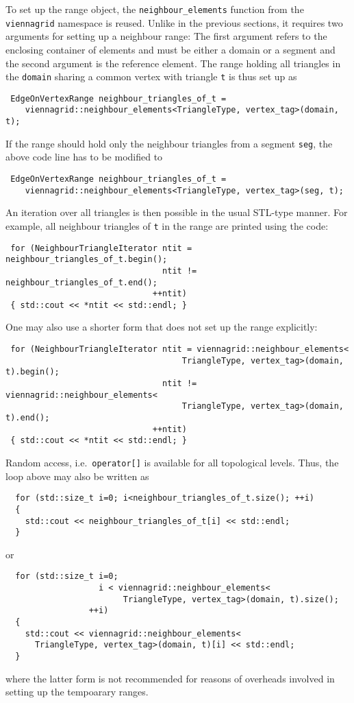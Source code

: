 To set up the range object, the \lstinline|neighbour_elements| function from the \lstinline|viennagrid| namespace is reused. Unlike in the previous sections, it requires two arguments
for setting up a neighbour range: The first argument refers to the enclosing container of elements and must be either a domain or a segment and the second argument is the reference element.
The range holding all triangles in the \lstinline|domain| sharing a common vertex with triangle \lstinline|t| is thus set up as
\begin{lstlisting}
 EdgeOnVertexRange neighbour_triangles_of_t =
    viennagrid::neighbour_elements<TriangleType, vertex_tag>(domain, t);
\end{lstlisting}
If the range should hold only the neighbour triangles from a segment \lstinline|seg|, the above code line has to be modified to
\begin{lstlisting}
 EdgeOnVertexRange neighbour_triangles_of_t =
    viennagrid::neighbour_elements<TriangleType, vertex_tag>(seg, t);
\end{lstlisting}
An iteration over all triangles is then possible in the usual STL-type manner. For example, all neighbour triangles of \lstinline|t| in the range are printed using the code:
\begin{lstlisting}
 for (NeighbourTriangleIterator ntit = neighbour_triangles_of_t.begin();
                                ntit != neighbour_triangles_of_t.end();
                              ++ntit)
 { std::cout << *ntit << std::endl; }
\end{lstlisting}

\pagebreak

One may also use a shorter form that does not set up the range explicitly:
\begin{lstlisting}
 for (NeighbourTriangleIterator ntit = viennagrid::neighbour_elements<
                                    TriangleType, vertex_tag>(domain, t).begin();
                                ntit != viennagrid::neighbour_elements<
                                    TriangleType, vertex_tag>(domain, t).end();
                              ++ntit)
 { std::cout << *ntit << std::endl; }
\end{lstlisting}

Random access, i.e.~\lstinline|operator[]| is available for all topological levels. Thus, the loop above may also be written as
\begin{lstlisting}
  for (std::size_t i=0; i<neighbour_triangles_of_t.size(); ++i)
  {
    std::cout << neighbour_triangles_of_t[i] << std::endl;
  }
\end{lstlisting}
or 
\begin{lstlisting}
  for (std::size_t i=0;
                   i < viennagrid::neighbour_elements<
                        TriangleType, vertex_tag>(domain, t).size();
                 ++i)
  {
    std::cout << viennagrid::neighbour_elements<
      TriangleType, vertex_tag>(domain, t)[i] << std::endl;
  }
\end{lstlisting}
where the latter form is not recommended for reasons of overheads involved in setting up the tempoarary ranges.
